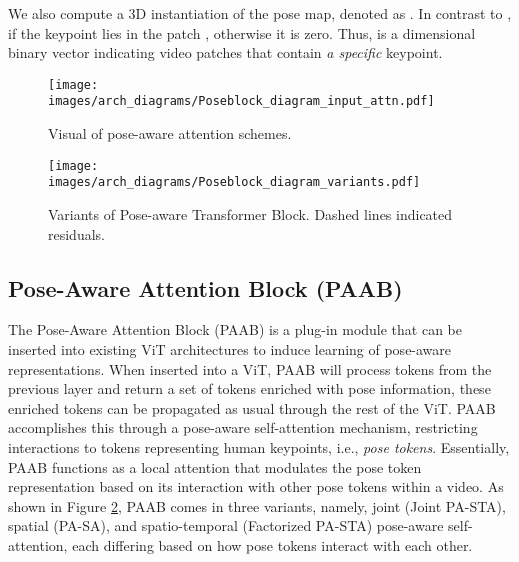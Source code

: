 \documentclass{article}
\begin{document}
We also compute a 3D instantiation of the pose map, denoted as . In contrast to ,  if the  keypoint lies in the patch  , otherwise it is zero.
Thus,  is a  dimensional binary vector indicating video patches that contain \textit{a specific} keypoint.


\begin{figure*}
    \begin{subfigure}{0.44\textwidth}
        \texttt{[image: images/arch\_diagrams/Poseblock\_diagram\_input\_attn.pdf]}
        \caption{Visual of pose-aware attention schemes.}
        \label{fig:paab_inputs_and_attentions}
    \end{subfigure}
    \hfill
    \begin{subfigure}{0.52\textwidth}
        \texttt{[image: images/arch\_diagrams/Poseblock\_diagram\_variants.pdf]}
        \caption{Variants of Pose-aware Transformer Block. Dashed lines indicated residuals.}
        \label{fig:paab_variants}
    \end{subfigure}
    \caption{\textbf{Overview of Pose-Aware Attention Block.} PAAB takes tokens processed by a ViT as input and applies a pose-aware attention to them. The attention is applied jointly (over pose tokens from all frames), spatially (over pose tokens in a single frame), or spatio-temporally. In spatio-temporal attention, traditional temporal attention is applied followed by pose aware spatial attention.} \vspace{-0.25in}
\end{figure*}

\subsection{Pose-Aware Attention Block (PAAB)}\label{sec:paab_introduction}
The Pose-Aware Attention Block (PAAB) is a plug-in module that can be inserted into existing ViT architectures to induce learning of pose-aware representations. When inserted into a ViT, PAAB will process tokens from the previous layer and return a set of tokens enriched with pose information, these enriched tokens can be propagated as usual through the rest of the ViT. PAAB accomplishes this through a pose-aware self-attention mechanism, restricting interactions to tokens representing human keypoints, i.e., \textit{pose tokens}. Essentially, PAAB functions as a local attention that modulates the pose token representation based on its interaction with other pose tokens within a video. As shown in Figure \ref{fig:paab_variants}, PAAB comes in three variants, namely, joint (Joint PA-STA), spatial (PA-SA), and spatio-temporal (Factorized PA-STA) pose-aware self-attention, each differing based on how pose tokens interact with each other.
\end{document}
